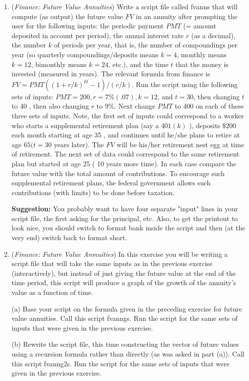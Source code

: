 \documentclass[../main.tex]{subfiles}
\begin{document}
\begin{enumerate}
\item (\emph{Finance: Future Value Annuities}) Write a script file called fvanns that will compute (as output) the future value $F V$ in an annuity after prompting the user for the following inputs: the periodic payment $P M T$ (= amount deposited in account per period), the annual interest rate $r$ (as a decimal), the number $k$ of periods per year, that is, the number of compoundings per year (so quarterly compoundings/deposits means $k=4$, monthly means $k=12$, bimonthly means $k=24$, etc.), and the time $t$ that the money is invested (measured in years). The relevant formula from finance is $F V=P M T\left((1+r / k)^{k t}-1\right) /(r / k)$. Run the script using the following sets of inputs: $P M T=200, r=7 \%(.07), k=12$, and $t=30$, then changing $t$ to 40 , then also changing $r$ to $9 \%$. Next change $P M T$ to 400 on each of these three sets of inputs. Note, the first set of inputs could correspond to a worker who starts a supplemental retirement plan (say a $401(k)$ ), deposits $\$ 200$ each month starting at age 35 , and continues until he/she plans to retire at age $65(t=30$ years later). The $F V$ will be his/her retirement nest egg at time of retirement. The next set of data could correspond to the same retirement plan but started at age 25 ( 10 years more time). In each case compare the future value with the total amount of contributions. To encourage such supplemental retirement plans, the federal government allows such contributions (with limits) to be done before taxation.

\textbf{Suggestion:} You probably want to have four separate "input" lines in your script file, the first asking for the principal, etc. Also, to get the printout to look nice, you should switch to format bank inside the script and then (at the very end) switch back to format short.

\item (\emph{Finance: Future Value Anmuities}) In this exercise you will be writing a script file that will take the same inputs as in the previous exercise (interactively), but instead of just giving the future value at the end of the time period, this script will produce a graph of the growth of the annuity's value as a function of time.

(a) Base your script on the formula given in the preceding exercise for future value annuities. Call this script fvanngs. Run the script for the same sets of inputs that were given in the previous exercise.

(b) Rewrite the script file, this time constructing the vector of future values using a recursion formula rather than directly (as was asked in part (a)). Call this script fvanng2s. Run the script for the same sets of inputs that were given in the previous exercise.


\end{enumerate}
\end{document}
